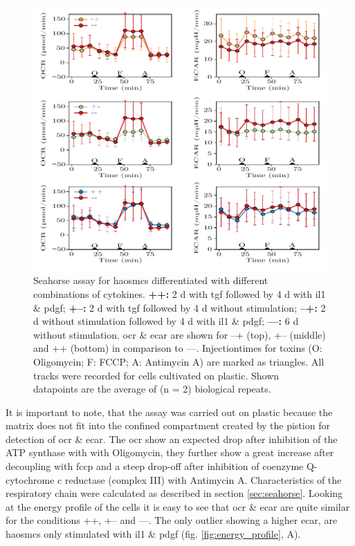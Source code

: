     \label{subsec:energy}
    \begin{figure}[h]
    \capstart
        \centering
    	\includegraphics{Abbildung/Seahorse_tracks.pdf}

    	\begin{minipage}{\captionwidth}
    		\caption[seahorse_tracks]{ \newline Seahorse assay for \acp{haosmc} differentiated with different combinations of cytokines.
            \textbf{++:} 2 d with \ac{tgf} followed by 4 d with \ac{il1} \& \ac{pdgf};
            \textbf{+–:} 2 d with \ac{tgf} followed by 4 d without stimulation;
            \textbf{–+:} 2 d without stimulation followed by 4 d with \ac{il1} \& \ac{pdgf};
            \textbf{––:} 6 d without stimulation.
            \ac{ocr} \& \ac{ecar} are shown for –+ (top), +– (middle) and ++ (bottom) in comparison to ––. Injectiontimes for toxins (O: Oligomycin; F: FCCP; A: Antimycin A) are marked as triangles. All tracks were recorded for cells cultivated on plastic. Shown datapoints are the average of (n = 2) biological repeats.
            }
    		\label{fig:seahorse_tracks}
    	\end{minipage}
    \end{figure}

    It is important to note, that the assay was carried out on plastic because the matrix does not fit into the confined compartment created by the pistion for detection of \ac{ocr} \& \ac{ecar}. The \ac{ocr} show an expected drop after inhibition of the ATP synthase with with Oligomycin, they further show a great increase after decoupling with \ac{fccp} and a steep drop-off after inhibition of coenzyme Q-cytochrome c reductase (complex III) with Antimycin A. Characteristics of the respiratory chain were calculated as described in section \ref{sec:seahorse}. Looking at the energy profile of the cells it is easy to see that \ac{ocr} \& \ac{ecar} are quite similar for the conditions ++, +– and ––. The only outlier showing a higher \ac{ecar}, are \acp{haosmc} only stimulated with \ac{il1} \& \ac{pdgf} (fig. \ref{fig:energy_profile}, A).

